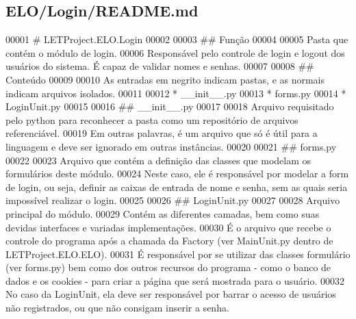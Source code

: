 \hypertarget{ELO_2Login_2README_8md_source}{\subsection{E\-L\-O/\-Login/\-R\-E\-A\-D\-M\-E.md}
}

\begin{DoxyCode}
00001 \textcolor{preprocessor}{# LETProject.ELO.Login}
00002 \textcolor{preprocessor}{}
00003 \textcolor{preprocessor}{## Função}
00004 \textcolor{preprocessor}{}
00005 Pasta que contém o módulo de login.
00006 Responsável pelo controle de login e logout dos usuários \textcolor{keywordflow}{do} sistema. É capaz de validar nomes e senhas.
00007 
00008 ## Conteúdo
00009 
00010 As entradas em negrito indicam pastas, e as normais indicam arquivos isolados.
00011 
00012 * \_\_init\_\_.py
00013 * forms.py
00014 * LoginUnit.py
00015 
00016 \textcolor{preprocessor}{## \_\_init\_\_.py}
00017 \textcolor{preprocessor}{}
00018 Arquivo requisitado pelo python para reconhecer a pasta como um repositório de arquivos referenciável.
00019 Em outras palavras, é um arquivo que só é útil para a linguagem e deve ser ignorado em outras instâncias.
00020 
00021 ## forms.py
00022 
00023 Arquivo que contém a definição das classes que modelam os formulários deste módulo.
00024 Neste caso, ele é responsável por modelar a form de login, ou seja, definir as caixas de entrada de nome e 
      senha, sem as quais seria impossível realizar o login.
00025 
00026 ## LoginUnit.py
00027 
00028 Arquivo principal \textcolor{keywordflow}{do} módulo.
00029 Contém as diferentes camadas, bem como suas devidas interfaces e variadas implementações.
00030 É o arquivo que recebe o controle \textcolor{keywordflow}{do} programa após a chamada da Factory (ver MainUnit.py dentro de 
      LETProject.ELO.ELO). 
00031 É responsável por se utilizar das classes formulário (ver forms.py) bem como dos outros recursos do 
      programa - como o banco de dados e os cookies - para criar a página que será mostrada para o usuário.
00032 No caso da LoginUnit, ela deve ser responsável por barrar o acesso de usuários não registrados, ou que não 
      consigam inserir a senha.
\end{DoxyCode}
